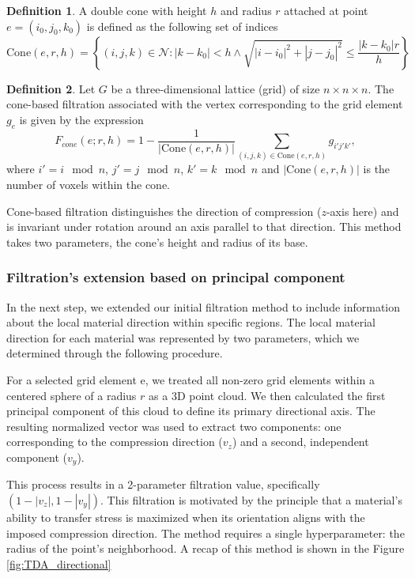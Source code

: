 \documentclass[sn-mathphys,Numbered]{sn-jnl}
\theoremstyle{definition}
\newtheorem{definition}{Definition}[section]
\begin{document}
\begin{definition}
A double cone with height $h$ and radius $r$ attached at point $e=(i_0, j_0, k_0)$ is defined as the following set of indices
\[ \mathrm{Cone}(e, r, h) = \left\{ (i, j, k) \in \mathcal{N}: |k - k_0| < h \land \sqrt{|i -i_0|^2 + |j -j_0|^2} \leq \frac{|k-k_0|r}{h}  \right\}  \]
\end{definition}

\begin{definition}
Let $G$ be a three-dimensional lattice (grid) of size $n \times n \times n$. The cone-based filtration associated with the vertex corresponding to the grid element $g_e$ is given by the expression
    \[F_{cone}(e; r,h) =1 - \frac{1}{|\mathrm{Cone}(e, r, h)|} {\sum_{(i,j,k) \in {\mathrm{Cone}}(e, r, h)}{g_{i'j'k'}}}, \]
    where $i' = i \mod n$, $ j' = j \mod n$, $ k' = k \mod n$ and $|\mathrm{Cone}(e, r, h)|$ is the number of voxels within the cone.
\end{definition}

Cone-based filtration distinguishes the direction of compression ($z$-axis here) and is invariant under rotation around an axis parallel to that direction. This method takes two parameters, the cone's height and radius of its base.

\subsubsection{Filtration's extension based on principal component}
In the next step, we extended our initial filtration method to include information about the local material direction within specific regions. The local material direction for each material was represented by two parameters, which we determined through the following procedure.

For a selected grid element e, we treated all non-zero grid elements within a centered sphere of a radius $r$ as a 3D point cloud. We then calculated the first principal component  of this cloud to define its primary directional axis. The resulting normalized vector was used to extract two components: one corresponding to the compression direction ($v_z$) and a second, independent component ($v_y$).

This process results in a 2-parameter filtration value, specifically $(1-|v_z|,1-|v_y|) $. This filtration is motivated by the principle that a material's ability to transfer stress is maximized when its orientation aligns with the imposed compression direction. The method requires a single hyperparameter: the radius of the point's neighborhood. A recap of this method is shown in the Figure {\ref{fig:TDA_directional}}
\end{document}
